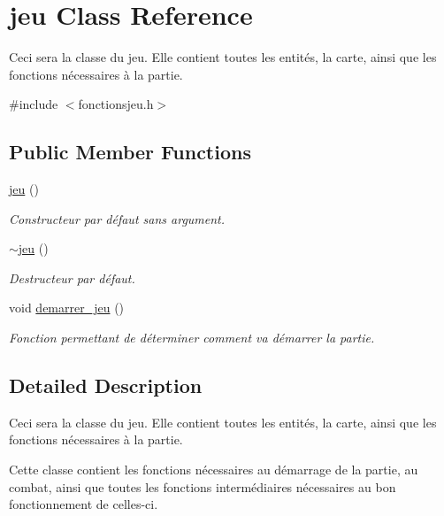 \hypertarget{classjeu}{}\section{jeu Class Reference}
\label{classjeu}


Ceci sera la classe du jeu. Elle contient toutes les entités, la carte, ainsi que les fonctions nécessaires à la partie.  




{\ttfamily \#include $<$fonctionsjeu.\+h$>$}

\subsection*{Public Member Functions}
\begin{DoxyCompactItemize}
\item 
\hyperlink{classjeu_a38513a7bfd0a7ea4e3a5612da2856016}{jeu} ()
\begin{DoxyCompactList}\small\item\em Constructeur par défaut sans argument. \end{DoxyCompactList}\item 
\mbox{\label{classjeu_a55385a33ef40e0579eb3a3634566c4a8}} 
\hyperlink{classjeu_a55385a33ef40e0579eb3a3634566c4a8}{$\sim$jeu} ()
\begin{DoxyCompactList}\small\item\em Destructeur par défaut. \end{DoxyCompactList}\item 
void \hyperlink{classjeu_aabf11934ce63bc5d71bbd27e1523fc45}{demarrer\+\_\+jeu} ()
\begin{DoxyCompactList}\small\item\em Fonction permettant de déterminer comment va démarrer la partie. \end{DoxyCompactList}\end{DoxyCompactItemize}


\subsection{Detailed Description}
Ceci sera la classe du jeu. Elle contient toutes les entités, la carte, ainsi que les fonctions nécessaires à la partie. 

Cette classe contient les fonctions nécessaires au démarrage de la partie, au combat, ainsi que toutes les fonctions intermédiaires nécessaires au bon fonctionnement de celles-\/ci.

